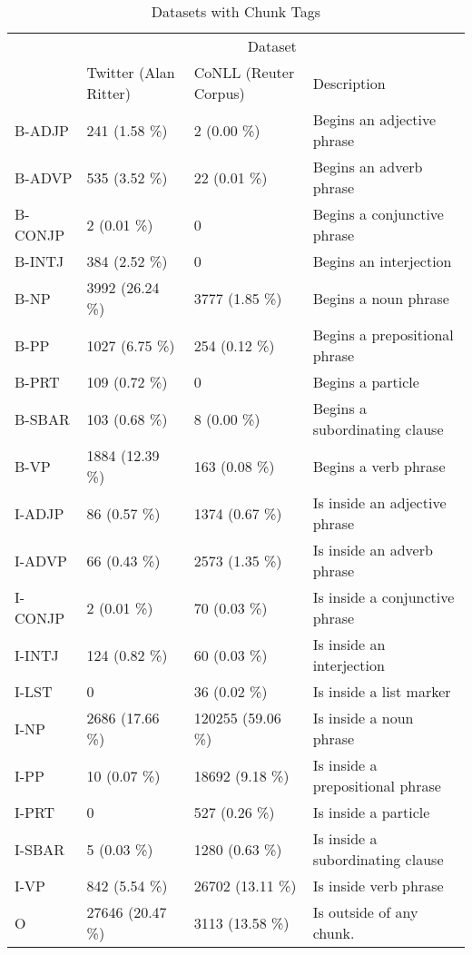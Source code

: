 \begin{table}[H]
\centering
\footnotesize
\begin{tabular}{|l|l|l|l|}
\hline
\multirow{2}{*}{} & \multicolumn{3}{c|}{Dataset} \\ \cline{2-4} 
 & Twitter (Alan Ritter) & CoNLL (Reuter Corpus) & Description \\ \hline
B-ADJP & 241 (1.58 \%) & 2 (0.00 \%) & Begins an adjective phrase  \\ \hline
B-ADVP & 535 (3.52 \%) & 22 (0.01 \%) & Begins an adverb phrase\\ \hline
B-CONJP & 2 (0.01 \%) & 0 &  Begins a conjunctive phrase\\ \hline
B-INTJ & 384 (2.52 \%) & 0 & Begins an interjection\\ \hline
B-NP & 3992 (26.24 \%) & 3777 (1.85 \%) & Begins a noun phrase \\ \hline
B-PP & 1027 (6.75 \%) & 254 (0.12 \%) & Begins a prepositional phrase \\ \hline
B-PRT & 109 (0.72 \%) & 0 & Begins a particle\\ \hline
B-SBAR & 103 (0.68 \%) & 8 (0.00 \%) & Begins a subordinating clause \\ \hline
B-VP & 1884 (12.39 \%) & 163 (0.08 \%) & Begins a verb phrase \\ \hline
I-ADJP & 86 (0.57 \%) & 1374 (0.67 \%) & Is inside an adjective phrase  \\ \hline
I-ADVP & 66 (0.43 \%) & 2573 (1.35 \%) & Is inside an adverb phrase\\ \hline
I-CONJP & 2 (0.01 \%) & 70 (0.03 \%) & Is inside a conjunctive phrase\\ \hline
I-INTJ & 124 (0.82 \%) & 60 (0.03 \%) & Is inside an interjection\\ \hline
I-LST & 0  & 36 (0.02 \%) & Is inside a list marker\\ \hline
I-NP & 2686 (17.66 \%) & 120255 (59.06 \%) & Is inside a noun phrase \\ \hline
I-PP & 10 (0.07 \%) & 18692 (9.18 \%) & Is inside a prepositional phrase \\ \hline
I-PRT & 0  & 527 (0.26 \%) & Is inside a particle\\ \hline
I-SBAR & 5 (0.03 \%) & 1280 (0.63 \%) & Is inside a subordinating clause \\ \hline
I-VP & 842 (5.54 \%) & 26702 (13.11 \%) & Is inside verb phrase \\ \hline
O & 27646 (20.47 \%) & 3113 (13.58 \%) & Is outside of any chunk.\\ \hline
\end{tabular}
\caption[Datasets with Chunk Tags]{Datasets with Chunk Tags}
\label{tab:data-chunk}
\end{table}

